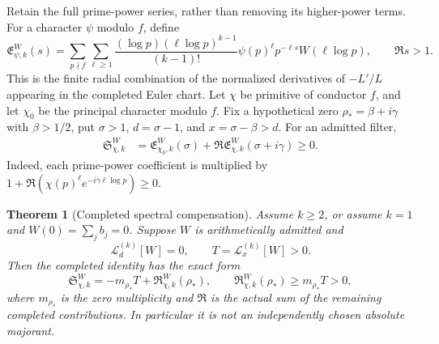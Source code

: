 \documentclass[11pt]{article}
\newtheorem{theorem}{Theorem}[section]
\theoremstyle{definition}
\theoremstyle{remark}
\begin{document}
Retain the full prime-power series, rather than removing its higher-power
terms.  For a character $\psi$ modulo $f$, define
\begin{equation}
 \mathfrak E_{\psi,k}^W(s)
 =\sum_{p\nmid f}\sum_{\ell\ge1}
 \frac{(\log p)(\ell\log p)^{k-1}}{(k-1)!}
 \psi(p)^\ell p^{-\ell s}W(\ell\log p),\qquad \Re s>1.
 \label{eq:filter-complete-euler}
\end{equation}
This is the finite radial combination of the normalized derivatives of
$-L'/L$ appearing in the completed Euler chart.  Let $\chi$ be primitive
of conductor $f$, and let $\chi_0$ be the principal character modulo $f$.
Fix a hypothetical zero $\rho_*=\beta+i\gamma$ with $\beta>1/2$,
put $\sigma>1$, $d=\sigma-1$, and $x=\sigma-\beta>d$.
For an admitted filter,
\begin{equation}
 \begin{split}
 \mathfrak S_{\chi,k}^W
 &=\mathfrak E_{\chi_0,k}^W(\sigma)
      +\Re\mathfrak E_{\chi,k}^W(\sigma+i\gamma)\ge0.
 \end{split}
 \label{eq:filter-two-channel-positive}
\end{equation}
Indeed, each prime-power coefficient is multiplied by
$1+\Re(\chi(p)^\ell e^{-i\gamma\ell\log p})\ge0$.

\begin{theorem}[Completed spectral compensation]
\label{thm:filter-compensation}
Assume $k\ge2$, or assume $k=1$ and $W(0)=\sum_jb_j=0$.
Suppose $W$ is arithmetically admitted and
\begin{equation}
 \mathcal L_d^{(k)}[W]=0,\qquad
 T=\mathcal L_x^{(k)}[W]>0.
 \label{eq:filter-normalized-target}
\end{equation}
Then the completed identity has the exact form
\begin{equation}
 \mathfrak S_{\chi,k}^W=-m_{\rho_*}T+
       \mathfrak R_{\chi,k}^W(\rho_*),\qquad
 \mathfrak R_{\chi,k}^W(\rho_*)\ge m_{\rho_*}T>0,
 \label{eq:filter-compensation}
\end{equation}
where $m_{\rho_*}$ is the zero multiplicity and $\mathfrak R$ is the
actual sum of the remaining completed contributions.  In particular it
is not an independently chosen absolute majorant.
\end{theorem}
\end{document}
